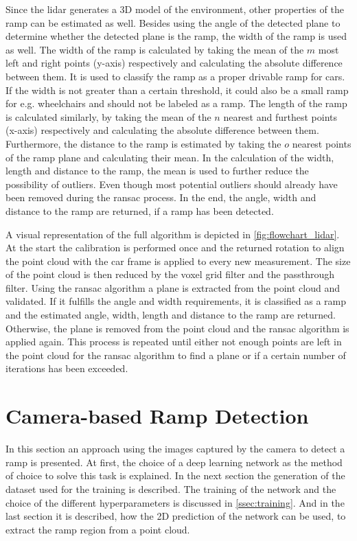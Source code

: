 Since the \gls{lidar} generates a 3D model of the environment, other properties of the ramp can be estimated as well.
Besides using the angle of the detected plane to determine whether the detected plane is the ramp, the width of the ramp is used as well.
The width of the ramp is calculated by taking the mean of the $m$ most left and right points (y-axis) respectively and calculating the absolute difference between them.
It is used to classify the ramp as a proper drivable ramp for cars.
If the width is not greater than a certain threshold, it could also be a small ramp for e.g. wheelchairs and should not be labeled as a ramp.
The length of the ramp is calculated similarly, by taking the mean of the $n$ nearest and furthest points (x-axis) respectively and calculating the absolute difference between them.
Furthermore, the distance to the ramp is estimated by taking the $o$ nearest points of the ramp plane and calculating their mean.
In the calculation of the width, length and distance to the ramp, the mean is used to further reduce the possibility of outliers.
Even though most potential outliers should already have been removed during the \gls{ransac} process.
In the end, the angle, width and distance to the ramp are returned, if a ramp has been detected.

A visual representation of the full algorithm is depicted in \cref{fig:flowchart_lidar}.
At the start the calibration is performed once and the returned rotation to align the point cloud with the car frame is applied to every new measurement.
The size of the point cloud is then reduced by the voxel grid filter and the passthrough filter.
Using the \gls{ransac} algorithm a plane is extracted from the point cloud and validated.
If it fulfills the angle and width requirements, it is classified as a ramp and the estimated angle, width, length and distance to the ramp are returned.
Otherwise, the plane is removed from the point cloud and the \gls{ransac} algorithm is applied again.
This process is repeated until either not enough points are left in the point cloud for the \gls{ransac} algorithm to find a plane or if a certain number of iterations has been exceeded.



\section{Camera-based Ramp Detection}
\label{sec:methods_camera}
In this section an approach using the images captured by the camera to detect a ramp is presented.
At first, the choice of a deep learning network as the method of choice to solve this task is explained.
In the next section the generation of the dataset used for the training is described.
The training of the network and the choice of the different hyperparameters is discussed in \cref{ssec:training}.
And in the last section it is described, how the 2D prediction of the network can be used, to extract the ramp region from a point cloud.

